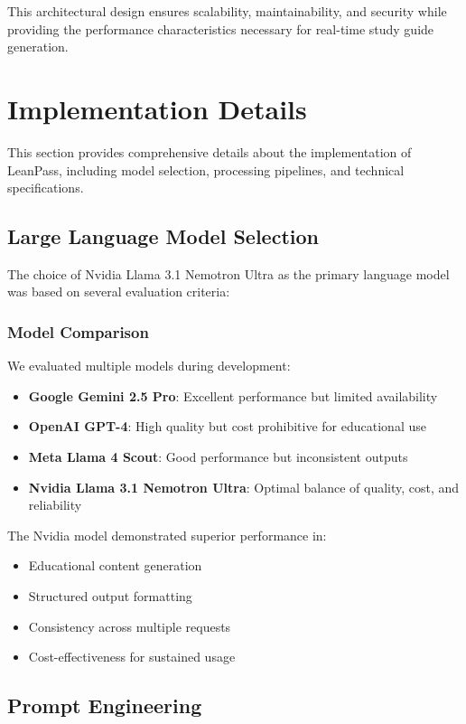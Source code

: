 \documentclass[conference]{IEEEtran}
\begin{document}
This architectural design ensures scalability, maintainability, and security while providing the performance characteristics necessary for real-time study guide generation.

\section{Implementation Details}

This section provides comprehensive details about the implementation of LeanPass, including model selection, processing pipelines, and technical specifications.

\subsection{Large Language Model Selection}

The choice of Nvidia Llama 3.1 Nemotron Ultra as the primary language model was based on several evaluation criteria:

\subsubsection{Model Comparison}
We evaluated multiple models during development:
\begin{itemize}
\item \textbf{Google Gemini 2.5 Pro}: Excellent performance but limited availability
\item \textbf{OpenAI GPT-4}: High quality but cost prohibitive for educational use
\item \textbf{Meta Llama 4 Scout}: Good performance but inconsistent outputs
\item \textbf{Nvidia Llama 3.1 Nemotron Ultra}: Optimal balance of quality, cost, and reliability
\end{itemize}

The Nvidia model demonstrated superior performance in:
\begin{itemize}
\item Educational content generation
\item Structured output formatting
\item Consistency across multiple requests
\item Cost-effectiveness for sustained usage
\end{itemize}

\subsection{Prompt Engineering}
\end{document}
